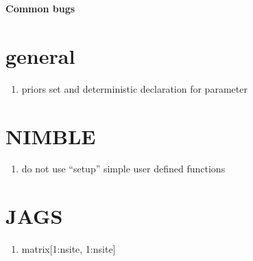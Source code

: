 \documentclass[12pt]{article}
\begin{document}
\begin{centering}
  \large {\bf Common bugs} \\
\end{centering}
\vspace{0.15in}

\section{general}
\begin{enumerate}
\item  priors set and deterministic declaration for parameter
\end{enumerate}

\section{NIMBLE}
\begin{enumerate}
\item do not use ``setup'' simple user defined functions  
\end{enumerate}

\section{JAGS}
\begin{enumerate}
\item matrix[1:nsite, 1:nsite]
\end{enumerate}
\end{document}
